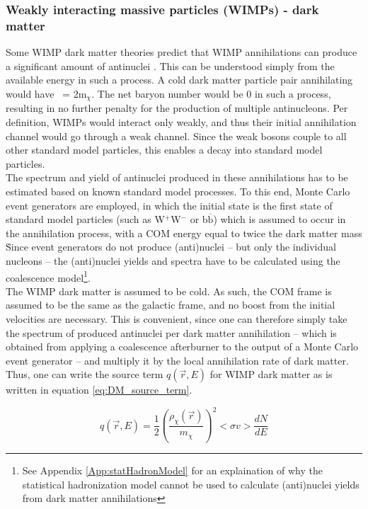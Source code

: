 \subsubsection{Weakly interacting massive particles (WIMPs) - dark matter}\label{sec:WIMPS}
Some WIMP dark matter theories predict that WIMP annihilations can produce a significant amount of antinuclei \cite{}. This can be understood simply from the available energy in such a process. A cold dark matter particle pair annihilating would have \Vs\ = $2\mathrm{m}_\chi$. The net baryon number would be 0 in such a process, resulting in no further penalty for the production of multiple antinucleons. Per definition, WIMPs would interact only weakly, and thus their initial annihilation channel would go through a weak channel. Since the weak bosons couple to all other standard model particles, this enables a decay into standard model particles. \\

The spectrum and yield of antinuclei produced in these annihilations has to be estimated based on known standard model processes. To this end, Monte Carlo event generators are employed\cite{}, in which the initial state is the first state of standard model particles (such as W$^+$W$^-$ or b$\overline{\mathrm{b}}$) which is assumed to occur in the annihilation process, with a COM energy equal to twice the dark matter mass \dmm\. Since event generators do not produce (anti)nuclei -- but only the individual nucleons -- the (anti)nuclei yields and spectra have to be calculated using the coalescence model\footnote{See Appendix \ref{App:statHadronModel} for an explaination of why the statistical hadronization model cannot be used to calculate (anti)nuclei yields from dark matter annihilations}.  \\ 

The WIMP dark matter is assumed to be cold. As such, the COM frame is assumed to be the same as the galactic frame, and no boost from the initial velocities are necessary. This is convenient, since one can therefore simply take the spectrum of produced antinuclei per dark matter annihilation -- which is obtained from applying a coalescence afterburner to the output of a Monte Carlo event generator -- and multiply it by the local annihilation rate of dark matter. Thus, one can write the source term $q(\vec{r}, E)$ for WIMP dark matter as is written in equation \ref{eq:DM_source_term}. 

\begin{equation}\label{eq:DM_source_term}
    q(\vec{r}, E) = \frac{1}{2} \left( \frac{\rho_{\chi}(\vec{r})}{m_\chi}\right)^2 <\sigma v > \frac{dN}{dE}
\end{equation}


